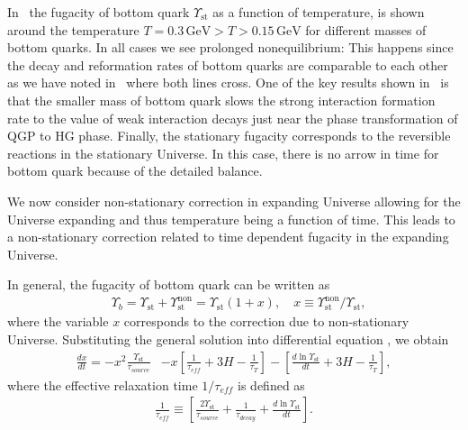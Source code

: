 In~ the fugacity of bottom quark $\Upsilon_{\mathrm{st}}$ as a function of temperature,  is shown around the temperature $T=0.3\,\mathrm{GeV}>T>0.15\,\mathrm{GeV}$ for different masses of bottom quarks. In all cases we see prolonged nonequilibrium: This happens since the decay and reformation rates of bottom quarks are comparable to each other as we have noted in~ where both lines cross. One of the key results shown in~ is that the smaller mass of bottom quark slows the strong interaction formation rate to the value of weak interaction decays just near the phase transformation of QGP to HG phase. Finally, the stationary fugacity corresponds to the reversible reactions in the stationary Universe. In this case, there is no arrow in time for bottom quark because of the detailed balance.

We now consider non-stationary correction in expanding Universe allowing for the Universe expanding and thus temperature being a function of time. This leads to a non-stationary correction related to time dependent fugacity in the expanding Universe. 

In general, the fugacity of bottom quark can be written as 
\begin{align}\label{Nonstationary_sol}
&\Upsilon_b=\Upsilon_{\mathrm{st}}+\Upsilon^{\mathrm{non}}_{\mathrm{st}}=\Upsilon_\mathrm{st}\left(1+x\right),\quad x\equiv{\Upsilon_\mathrm{st}^{\mathrm{non}}}/{\Upsilon_\mathrm{st}},
\end{align}
where the variable $x$ corresponds to the correction due to non-stationary Universe. Substituting the general solution  into differential equation , we obtain
\begin{align}\label{Nonstationary_eq}
\frac{dx}{dt}=-x^2\frac{\Upsilon_\mathrm{st}}{\tau_{source}}&-x\left[\frac{1}{\tau_{eff}}+3H-\frac{1}{\tau_T}\right]-\left[\frac{d\ln\Upsilon_\mathrm{st}}{dt}+3H-\frac{1}{\tau_T}\right],
\end{align}
where the effective relaxation time $1/\tau_{eff}$ is defined as
\begin{align}
\frac{1}{\tau_{eff}}\equiv\left[\frac{2\Upsilon_\mathrm{st}}{\tau_{source}}+\frac{1}{\tau_{decay}}+\frac{d\ln\Upsilon_\mathrm{st}}{dt}\right].
\end{align}

